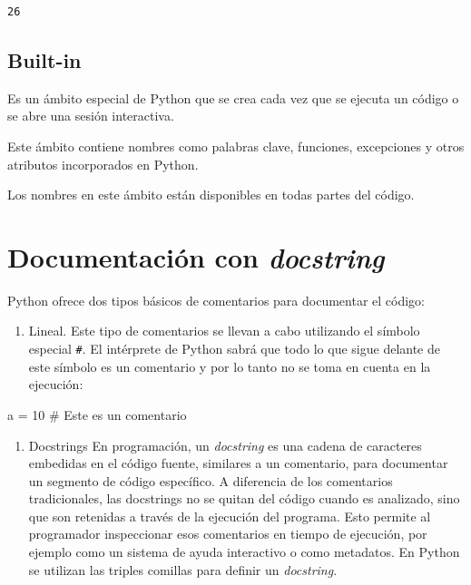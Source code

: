 \documentclass[
  spanish,
  letterpaper,
]{scrbook}
\newenvironment{Shaded}{\begin{snugshade}}{\end{snugshade}}
\newcommand{\CommentTok}[1]{\textcolor[rgb]{0.37,0.37,0.37}{#1}}
\newcommand{\DecValTok}[1]{\textcolor[rgb]{0.68,0.00,0.00}{#1}}
\newcommand{\NormalTok}[1]{\textcolor[rgb]{0.00,0.23,0.31}{#1}}
\newcommand{\OperatorTok}[1]{\textcolor[rgb]{0.37,0.37,0.37}{#1}}
\providecommand{\tightlist}{%
  \setlength{\itemsep}{0pt}\setlength{\parskip}{0pt}}
\theoremstyle{definition}
\theoremstyle{remark}
\begin{document}
\begin{verbatim}
26
\end{verbatim}

\subsection{Built-in}\label{built-in}

Es un ámbito especial de Python que se crea cada vez que se ejecuta un
código o se abre una sesión interactiva.

Este ámbito contiene nombres como palabras clave, funciones, excepciones
y otros atributos incorporados en Python.

Los nombres en este ámbito están disponibles en todas partes del código.

\section{\texorpdfstring{Documentación con
\emph{docstring}}{Documentación con docstring}}\label{documentaciuxf3n-con-docstring}

Python ofrece dos tipos básicos de comentarios para documentar el
código:

\begin{enumerate}
\def\labelenumi{\arabic{enumi}.}
\tightlist
\item
  Lineal. Este tipo de comentarios se llevan a cabo utilizando el
  símbolo especial \texttt{\#}. El intérprete de Python sabrá que todo
  lo que sigue delante de este símbolo es un comentario y por lo tanto
  no se toma en cuenta en la ejecución:
\end{enumerate}

\begin{Shaded}
\begin{Highlighting}[]
\NormalTok{a }\OperatorTok{=} \DecValTok{10} \CommentTok{\# Este es un comentario}
\end{Highlighting}
\end{Shaded}

\begin{enumerate}
\def\labelenumi{\arabic{enumi}.}
\setcounter{enumi}{1}
\tightlist
\item
  Docstrings En programación, un \emph{docstring} es una cadena de
  caracteres embedidas en el código fuente, similares a un comentario,
  para documentar un segmento de código específico. A diferencia de los
  comentarios tradicionales, las docstrings no se quitan del código
  cuando es analizado, sino que son retenidas a través de la ejecución
  del programa. Esto permite al programador inspeccionar esos
  comentarios en tiempo de ejecución, por ejemplo como un sistema de
  ayuda interactivo o como metadatos. En Python se utilizan las triples
  comillas para definir un \emph{docstring}.
\end{enumerate}
\end{document}
